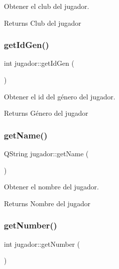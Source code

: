 Obtener el club del jugador. 

\begin{DoxyReturn}{Returns}
Club del jugador 
\end{DoxyReturn}
\mbox{\label{classjugador_adb2f8c9bba1afa83be6ebf6a651769b2}} 
\subsubsection{\texorpdfstring{get\+Id\+Gen()}{getIdGen()}}
{\footnotesize\ttfamily int jugador\+::get\+Id\+Gen (\begin{DoxyParamCaption}{ }\end{DoxyParamCaption})}



Obtener el id del género del jugador. 

\begin{DoxyReturn}{Returns}
Género del jugador 
\end{DoxyReturn}
\mbox{\label{classjugador_adc3df126f15f2bb2aec01cc04145ae14}} 
\subsubsection{\texorpdfstring{get\+Name()}{getName()}}
{\footnotesize\ttfamily Q\+String jugador\+::get\+Name (\begin{DoxyParamCaption}{ }\end{DoxyParamCaption})}



Obtener el nombre del jugador. 

\begin{DoxyReturn}{Returns}
Nombre del jugador 
\end{DoxyReturn}
\mbox{\label{classjugador_ad1b16c02d5c0ec28e2a7db3ac0a09cda}} 
\subsubsection{\texorpdfstring{get\+Number()}{getNumber()}}
{\footnotesize\ttfamily int jugador\+::get\+Number (\begin{DoxyParamCaption}{ }\end{DoxyParamCaption})}



